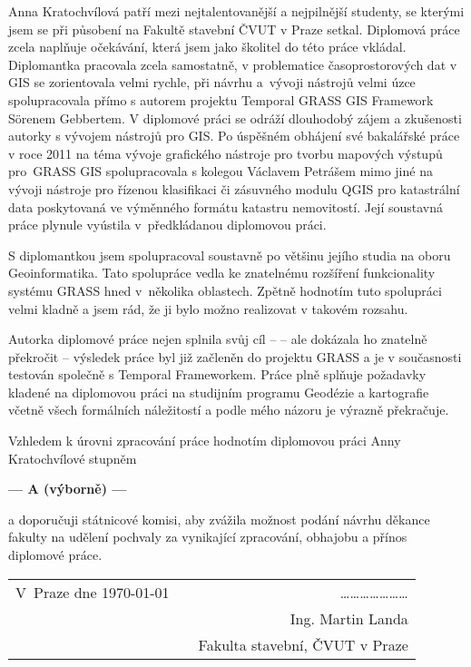 \documentclass[czech,11pt,a4paper]{article}
\begin{document}
Anna Kratochvílová patří mezi nejtalentovanější a nejpilnější
studenty, se kterými jsem se při působení na Fakultě stavební ČVUT v
Praze setkal. Diplomová práce zcela naplňuje očekávání, která jsem
jako školitel do této práce vkládal. Diplomantka pracovala zcela
samostatně, v problematice časoprostorových dat v GIS se zorientovala
velmi rychle, při návrhu a~vývoji nástrojů velmi úzce spolupracovala
přímo s autorem projektu Temporal GRASS GIS Framework S\"orenem
Gebbertem. V diplomové práci se odráží dlouhodobý zájem a zkušenosti
autorky s vývojem nástrojů pro GIS. Po úspěšném obhájení své
bakalářské práce v roce 2011 na téma vývoje grafického nástroje pro
tvorbu mapových výstupů pro~GRASS GIS spolupracovala s kolegou
Václavem Petrášem mimo jiné na vývoji nástroje pro řízenou klasifikaci
či zásuvného modulu QGIS pro katastrální data poskytovaná ve výměnného
formátu katastru nemovitostí. Její soustavná práce plynule vyústila
v~předkládanou diplomovou práci.

S diplomantkou jsem spolupracoval soustavně po většinu jejího studia
na oboru Geoinformatika. Tato spolupráce vedla ke znatelnému rozšíření
funkcionality systému GRASS hned v~několika oblastech. Zpětně hodnotím
tuto spolupráci velmi kladně a jsem rád, že ji bylo možno realizovat v
takovém rozsahu. \newpage

Autorka diplomové práce nejen splnila svůj cíl --  -- ale
dokázala ho znatelně překročit -- výsledek práce byl již začleněn do
projektu GRASS a je v současnosti testován společně s Temporal
Frameworkem. Práce plně splňuje požadavky kladené na diplomovou práci
na studijním programu Geodézie a kartografie včetně všech formálních
náležitostí a podle mého názoru je výrazně překračuje.

Vzhledem k úrovni zpracování práce hodnotím diplomovou práci Anny
Kratochvílové stupněm

\begin{center}
{\bf --- A (výborně)  ---}
\end{center}

a doporučuji státnicové komisi, aby zvážila možnost podání návrhu
děkance fakulty na udělení pochvaly za vynikající zpracování, obhajobu
a přínos diplomové práce.

\vspace{2cm}

\noindent \begin{tabular}{lp{}r}
V~Praze dne \today & & \ldots\ldots\ldots\ldots\ldots\ldots\ldots \\
& & Ing. Martin Landa \\
& & Fakulta stavební, ČVUT v Praze \\
\end{tabular}
\end{document}
